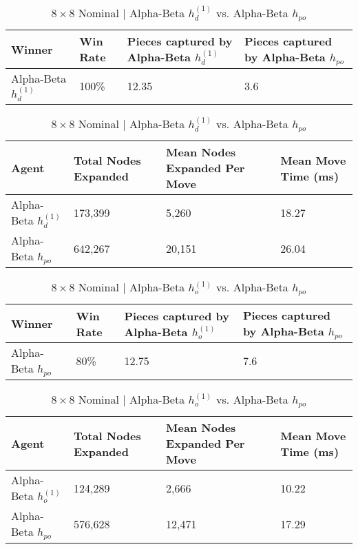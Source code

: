 \documentclass{article}[12pt]
\begin{document}
%

\begin{table}[ht]
	\centering
	\begin{tabular}{l | l | l | l}
		\hline
		Winner & Win Rate & Pieces captured by Alpha-Beta $h_{d}^{(1)}$ & Pieces captured by Alpha-Beta $h_{po}$ \\
		\hline \hline 
		Alpha-Beta $h_{d}^{(1)}$  & 100\% & 12.35 & 3.6 \\
		\hline
	\end{tabular}
	
	\vspace{10px}
	
	\begin{tabular}{l | l | l | l}
		\hline
		Agent & Total Nodes Expanded & Mean Nodes Expanded Per Move & Mean Move Time (ms) \\
		\hline \hline 
		Alpha-Beta $h_{d}^{(1)}$  & 173,399& 5,260& 18.27 \\
		Alpha-Beta $h_{po}$ & 642,267 & 20,151 & 26.04\\
		\hline
	\end{tabular}
	\caption{$8 \times 8$ Nominal | Alpha-Beta $h_{d}^{(1)}$ vs. Alpha-Beta $h_{po}$} \label{tab:t13}
\end{table}

%

\begin{table}[ht]
	\centering
	\begin{tabular}{l | l | l | l}
		\hline
		Winner & Win Rate & Pieces captured by Alpha-Beta $h_{o}^{(1)}$ & Pieces captured by Alpha-Beta $h_{po}$ \\
		\hline \hline 
		Alpha-Beta $h_{po}$ & 80\% & 12.75 & 7.6 \\
		\hline
	\end{tabular}
	
	\vspace{10px}
	
	\begin{tabular}{l | l | l | l}
		\hline
		Agent & Total Nodes Expanded & Mean Nodes Expanded Per Move & Mean Move Time (ms) \\
		\hline \hline 
		Alpha-Beta $h_{o}^{(1)}$  & 124,289& 2,666 & 10.22 \\
		Alpha-Beta $h_{po}$ & 576,628 & 12,471 & 17.29\\
		\hline
	\end{tabular}
	\caption{$8 \times 8$ Nominal | Alpha-Beta $h_{o}^{(1)}$ vs. Alpha-Beta $h_{po}$} \label{tab:t14}
\end{table}
\end{document}
